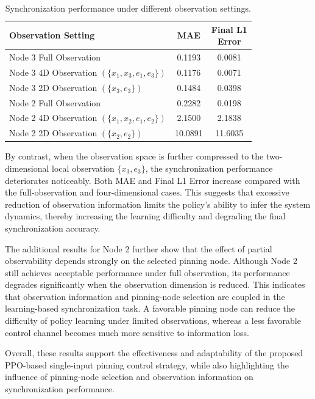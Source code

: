 \documentclass[10pt,twocolumn]{article}
\theoremstyle{definition}
\begin{document}
\begin{table}[htbp]
	\centering
	\setlength{\tabcolsep}{3pt}
	\renewcommand{\arraystretch}{1.12}
	\caption{Synchronization performance under different observation settings.}
	\label{tab:partial_observation}
	\begin{tabularx}{\linewidth}{@{}>{\raggedright\arraybackslash}Xcc@{}}
		\toprule
		Observation Setting & MAE & \makecell{Final L1\\Error} \\
		\midrule
		Node 3 Full Observation & 0.1193 & 0.0081 \\
		Node 3 4D Observation $(\{x_1,x_3,e_1,e_3\})$ & 0.1176 & 0.0071 \\
		Node 3 2D Observation $(\{x_3,e_3\})$ & 0.1484 & 0.0398 \\
		Node 2 Full Observation & 0.2282 & 0.0198 \\
		Node 2 4D Observation $(\{x_1,x_2,e_1,e_2\})$ & 2.1500 & 2.1838 \\
		Node 2 2D Observation $(\{x_2,e_2\})$ & 10.0891 & 11.6035 \\
		\bottomrule
	\end{tabularx}
\end{table}

By contrast, when the observation space is further compressed to the two-dimensional local observation $\{x_3,e_3\}$, the synchronization performance deteriorates noticeably. Both MAE and Final L1 Error increase compared with the full-observation and four-dimensional cases. This suggests that excessive reduction of observation information limits the policy's ability to infer the system dynamics, thereby increasing the learning difficulty and degrading the final synchronization accuracy.

The additional results for Node 2 further show that the effect of partial observability depends strongly on the selected pinning node. Although Node 2 still achieves acceptable performance under full observation, its performance degrades significantly when the observation dimension is reduced. This indicates that observation information and pinning-node selection are coupled in the learning-based synchronization task. A favorable pinning node can reduce the difficulty of policy learning under limited observations, whereas a less favorable control channel becomes much more sensitive to information loss.

Overall, these results support the effectiveness and adaptability of the proposed PPO-based single-input pinning control strategy, while also highlighting the influence of pinning-node selection and observation information on synchronization performance.
\end{document}
